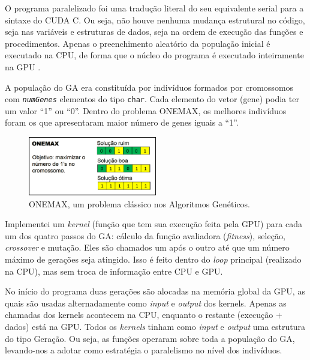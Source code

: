	O programa paralelizado foi uma tradução literal do seu equivalente serial para a sintaxe do CUDA C. Ou seja, não houve nenhuma mudança estrutural no código, seja nas variáveis e estruturas de dados, seja na ordem de execução das funções e procedimentos. Apenas o preenchimento aleatório da população inicial é executado na CPU, de forma que o núcleo do programa é executado inteiramente na GPU \cite{onemaxNaGPU}. 

	A população do GA era constituída por indivíduos formados por cromossomos com \textit{\texttt{numGenes}} elementos do tipo \texttt{char}. Cada elemento do vetor (gene) podia ter um valor  “1” ou “0”. Dentro do problema ONEMAX, os melhores indivíduos foram os que apresentaram maior número de genes iguais a “1”.
		
	\begin{figure}[htbp]
		\centering
			\includegraphics[width=0.50\textwidth]{figs/resultados/onemax/onemax_objetivo.png}
		\caption{ONEMAX, um problema clássico nos Algoritmos Genéticos.}
		\label{fig:onemax_objetivo}
	\end{figure}
		
	Implementei um \emph{kernel} (função que tem sua execução feita pela GPU) para cada um dos quatro passos do GA: cálculo da função avaliadora (\emph{fitness}), seleção, \emph{crossover} e mutação. Eles são chamados um após o outro até que um número máximo de gerações seja atingido. Isso é feito dentro do \emph{loop} principal (realizado na CPU), mas sem troca de informação entre CPU e GPU.
	
	No início do programa duas gerações são alocadas na memória global da GPU, as quais são usadas alternadamente como \emph{input} e \emph{output} dos kernels. Apenas as chamadas dos kernels acontecem na CPU, enquanto o restante (execução + dados) está na GPU. Todos os \emph{kernels} tinham como \emph{input} e \emph{output} uma estrutura do tipo Geração. Ou seja, as funções operaram sobre toda a população do GA, levando-nos a adotar como estratégia o paralelismo no nível dos indivíduos.
	
